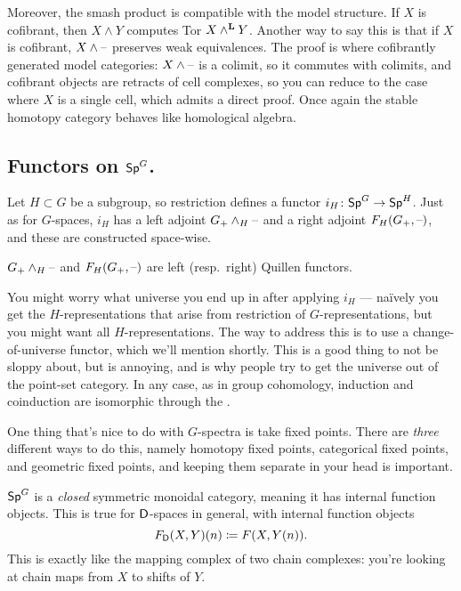 Moreover, the smash product is compatible with the model structure. If $X$ is cofibrant, then $X\wedge Y$ computes
Tor $X\wedge^\mathbf L Y$. Another way to say this is that if $X$ is cofibrant, $X\wedge\text{--}$ preserves weak equivalences.
The proof is where cofibrantly generated model categories: $X\wedge\text{--}$ is a colimit, so it commutes with colimits,
and cofibrant objects are retracts of cell complexes, so you can reduce to the case where $X$ is a single cell,
which admits a direct proof. Once again the stable homotopy category behaves like homological algebra.
\subsection*{Functors on $\mathsf{Sp}^G$.}
Let $H\subset G$ be a subgroup, so restriction defines a functor $i_H\colon \mathsf{Sp}^G\to\mathsf{Sp}^H$. Just as for
$G$-spaces, $i_H$ has a left adjoint $G_+\wedge_H\text{--}$ and a right adjoint $F_H(G_+,\text{--})$, and these are constructed
space-wise.
\begin{prop}
$G_+\wedge_H\text{--}$ and $F_H(G_+,\text{--})$ are left (resp.\ right) Quillen functors.
\end{prop}
\begin{rem}
You might worry what universe you end up in after applying $i_H$ --- naïvely you get the $H$-representations that
arise from restriction of $G$-representations, but you might want all $H$-representations. The way to address this
is to use a change-of-universe functor, which we'll mention shortly. This is a good thing to not be sloppy about,
but is annoying, and is why people try to get the universe out of the point-set category. In any case, as in group
cohomology, induction and coinduction are isomorphic through the .
\end{rem}
One thing that's nice to do with $G$-spectra is take fixed points. There are \emph{three} different ways to do
this, namely homotopy fixed points, categorical fixed points, and geometric fixed points, and keeping them separate
in your head is important.

$\mathsf{Sp}^G$ is a \emph{closed} symmetric monoidal category, meaning it has internal function objects. This is true for
$\mathsf D$-spaces in general, with internal function objects
\[F_\mathsf D(X,Y)(n) \coloneqq F(X, Y(n)).\]
This is exactly like the mapping complex of two chain complexes: you're looking at chain maps from $X$ to shifts of
$Y$.

